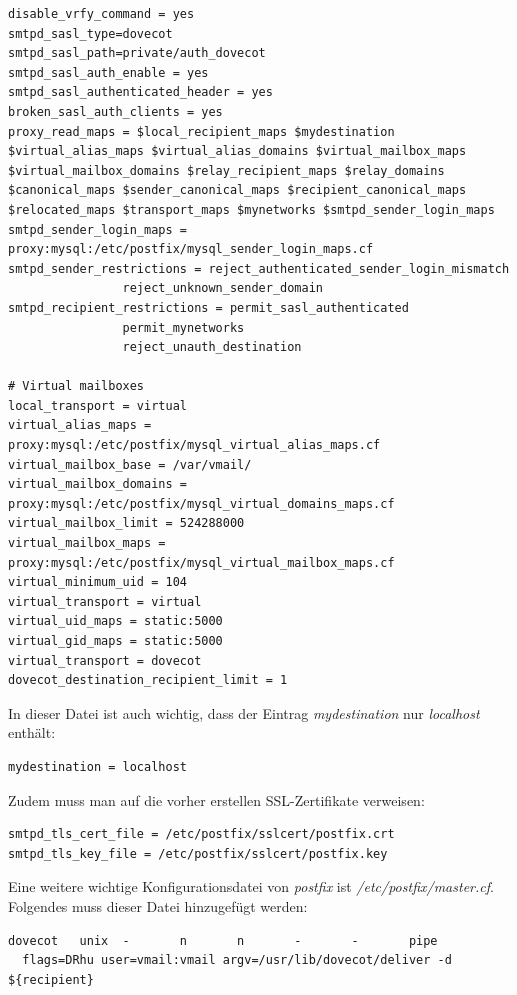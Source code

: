 \begin{lstlisting}
disable_vrfy_command = yes
smtpd_sasl_type=dovecot
smtpd_sasl_path=private/auth_dovecot
smtpd_sasl_auth_enable = yes
smtpd_sasl_authenticated_header = yes
broken_sasl_auth_clients = yes
proxy_read_maps = $local_recipient_maps $mydestination $virtual_alias_maps $virtual_alias_domains $virtual_mailbox_maps $virtual_mailbox_domains $relay_recipient_maps $relay_domains $canonical_maps $sender_canonical_maps $recipient_canonical_maps $relocated_maps $transport_maps $mynetworks $smtpd_sender_login_maps
smtpd_sender_login_maps = proxy:mysql:/etc/postfix/mysql_sender_login_maps.cf
smtpd_sender_restrictions = reject_authenticated_sender_login_mismatch
                reject_unknown_sender_domain
smtpd_recipient_restrictions = permit_sasl_authenticated
                permit_mynetworks
                reject_unauth_destination

# Virtual mailboxes
local_transport = virtual
virtual_alias_maps = proxy:mysql:/etc/postfix/mysql_virtual_alias_maps.cf
virtual_mailbox_base = /var/vmail/
virtual_mailbox_domains = proxy:mysql:/etc/postfix/mysql_virtual_domains_maps.cf
virtual_mailbox_limit = 524288000
virtual_mailbox_maps = proxy:mysql:/etc/postfix/mysql_virtual_mailbox_maps.cf
virtual_minimum_uid = 104
virtual_transport = virtual
virtual_uid_maps = static:5000
virtual_gid_maps = static:5000
virtual_transport = dovecot
dovecot_destination_recipient_limit = 1
\end{lstlisting}

In dieser Datei ist auch wichtig, dass der Eintrag \textit{mydestination} nur \textit{localhost} enthält:

\begin{lstlisting}
mydestination = localhost
\end{lstlisting}

Zudem muss man auf die vorher erstellen SSL-Zertifikate verweisen:

\begin{lstlisting}
smtpd_tls_cert_file = /etc/postfix/sslcert/postfix.crt
smtpd_tls_key_file = /etc/postfix/sslcert/postfix.key
\end{lstlisting}

Eine weitere wichtige Konfigurationsdatei von \textit{postfix} ist \textit{/etc/postfix/master.cf}. \\
Folgendes muss dieser Datei hinzugefügt werden:

\begin{lstlisting}
dovecot   unix  -       n       n       -       -       pipe
  flags=DRhu user=vmail:vmail argv=/usr/lib/dovecot/deliver -d ${recipient}
\end{lstlisting}

